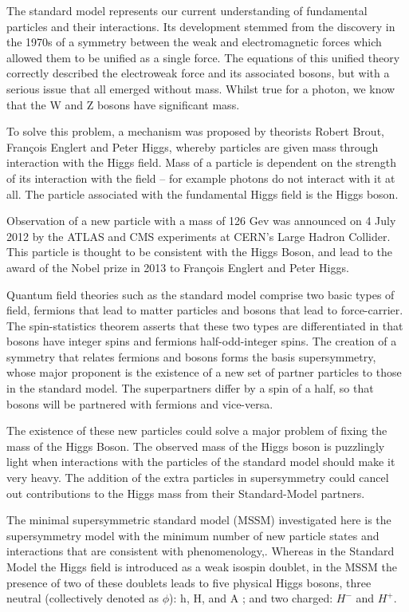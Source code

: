 The standard model represents our current understanding of fundamental particles and their interactions. Its development stemmed from the discovery in the 1970s of a symmetry between the weak and electromagnetic forces which allowed them to be unified as a single force. The equations of this unified theory correctly described the electroweak force and its associated bosons, but with a serious issue that all emerged without mass. Whilst true for a photon, we know that the W and Z bosons have significant mass.

To solve this problem, a mechanism was proposed by theorists Robert Brout, François Englert and Peter Higgs, whereby particles are given mass through interaction with the Higgs field. Mass of a particle is dependent on the strength of its interaction with the field – for example photons do not interact with it at all. The particle associated with the fundamental Higgs field is the Higgs boson.

Observation of a new particle with a mass of 126 Gev was announced on 4 July 2012 by the ATLAS and CMS experiments at CERN's Large Hadron Collider. This particle is thought to be consistent with the Higgs Boson, and lead to the award of the Nobel prize in 2013 to François Englert and Peter Higgs.


Quantum field theories such as the standard model comprise two basic types of field, fermions that lead to matter particles and bosons that lead to force-carrier. The spin-statistics theorem asserts that these two types are differentiated in that bosons have integer spins and fermions half-odd-integer spins. The creation of a symmetry that relates fermions and bosons forms the basis supersymmetry, whose major proponent is the existence of a new set of partner particles to those in the standard model. The superpartners differ by a spin of a half, so that bosons will be partnered with fermions and vice-versa. 

The existence of these new particles could solve a major problem of fixing the mass of the Higgs Boson. The observed mass of the Higgs boson is puzzlingly light when interactions with the particles of the standard model should make it very heavy. The addition of the extra particles in supersymmetry could cancel out contributions to the Higgs mass from their Standard-Model partners. 

The minimal supersymmetric standard model (MSSM) investigated here is the supersymmetry model with the minimum number of new particle states and interactions that are consistent with phenomenology,. Whereas in the Standard Model the Higgs field is introduced as a weak isospin doublet, in the
MSSM the presence of two of these doublets leads to five physical Higgs bosons, three neutral (collectively denoted as $\phi$): h, H, and A ; and two charged: $H^-$ and $H^+$.

